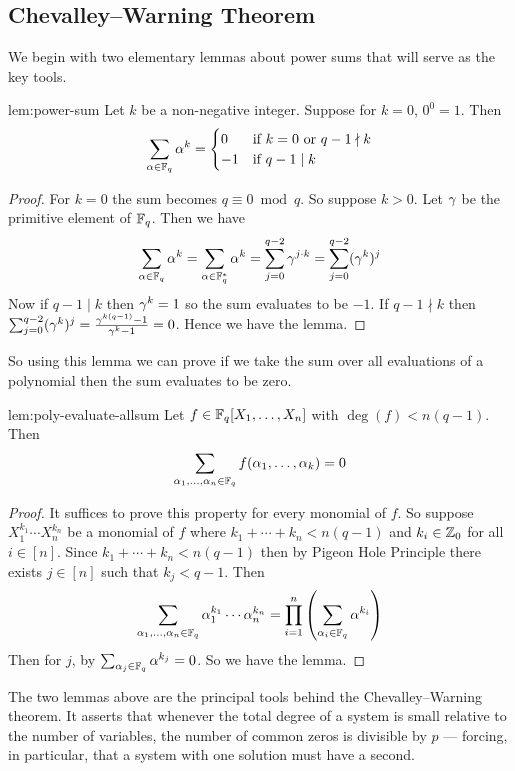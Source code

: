 \subsection{Chevalley--Warning Theorem}
%
We begin with two elementary lemmas about power sums that will serve as the key tools.
\begin{lemma}{}{lem:power-sum}
  Let $k$ be a non-negative integer. Suppose for $k=0$, $0^0=1$. Then $$\sum_{\alpha\in\mathbb{F}_q}\alpha^k=\begin{cases}
    0 & \text{if $k=0$ or $q-1\nmid k$}\\ 
    -1 & \text{if $q-1\mid k$}
  \end{cases}$$
\end{lemma}
\begin{proof}
  For $k=0$ the sum becomes $q\equiv 0 \bmod q$. So suppose $k>0$. Let $\gamma$ be the primitive element of $\mathbb{F}_q$. Then we have $$\sum_{\alpha\in\mathbb{F}_q}\alpha^k=\sum_{\alpha\in\mathbb{F}_q^*}\alpha^k=\sum_{j=0}^{q-2}\gamma^{j\cdot k}=\sum_{j=0}^{q-2}(\gamma^k)^j$$Now if $q-1\mid k$ then $\gamma^k=1$ so the sum evaluates to be $-1$. If $q-1\nmid k$ then $\sum_{j=0}^{q-2}(\gamma^k)^j=\frac{\gamma^{k(q-1)}-1}{\gamma^k-1}=0$. Hence we have the lemma. 
\end{proof}

So using this lemma we can prove if we take the sum over all evaluations of a polynomial then the sum evaluates to be zero.
\begin{lemma}{}{lem:poly-evaluate-allsum}
  Let $f\in\mathbb{F}_q[X_1,\dots,X_n]$ with $\deg(f)<n(q-1)$. Then $$\sum_{\alpha_1,\dots,\alpha_n\in\mathbb{F}_q}f(\alpha_1,\dots, \alpha_k)=0$$
\end{lemma}
\begin{proof}
  It suffices to prove this property for every monomial of $f$. So suppose $X_1^{k_1}\cdots X_n^{k_n}$ be a monomial of $f$ where $k_1+\cdots+k_n<n(q-1)$ and $k_i\in\mathbb{Z}_0$ for all $i\in[n]$. Since $k_1+\cdots+k_n<n(q-1)$ then by Pigeon Hole Principle there exists $j\in[n]$ such that $k_j< q-1$. Then
  $$\sum_{\alpha_1,\dots,\alpha_n\in\mathbb{F}_q}\alpha_1^{k_1}\cdots \alpha_n^{k_n}=\prod_{i=1}^n \left(\sum_{\alpha_i\in\mathbb{F}_q}\alpha^{k_i}\right)$$ Then for $j$, by  $\sum_{\alpha_j\in\mathbb{F}_q}\alpha^{k_j}=0$. So we have the lemma.
\end{proof}

The two lemmas above are the principal tools behind the Chevalley--Warning theorem. It asserts that whenever the total degree of a system is small relative to the number of variables, the number of common zeros is divisible by $p$ --- forcing, in particular, that a system with one solution must have a second.

